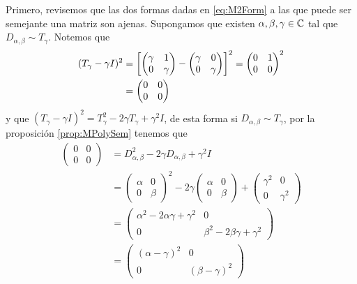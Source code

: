 Primero, revisemos que las dos formas dadas en \eqref{eq:M2Form} a las que puede ser semejante una matriz son ajenas. Supongamos que existen $\alpha, \beta, \gamma \in \mathbb{C}$ tal que $ D_{\alpha, \beta} \sim T_\gamma $. Notemos que
\begin{align*}
  (T_\gamma - \gamma I)^2 
    &= \corch{ \begin{pmatrix} \gamma & 1 \\ 0 & \gamma \end{pmatrix} - \begin{pmatrix} \gamma & 0 \\ 0 & \gamma \end{pmatrix} }^2 
     = \begin{pmatrix} 0 & 1 \\ 0 & 0  \end{pmatrix}^2  \\
    &= \begin{pmatrix} 0 & 0 \\ 0 & 0  \end{pmatrix}
\end{align*}
y que $(T_\gamma - \gamma I)^2 = T_\gamma^2 - 2\gamma T_\gamma + \gamma^2 I$, de esta forma si $ D_{\alpha,\beta} \sim T_\gamma $, por la proposición \ref{prop:MPolySem} tenemos que
\begin{align*}
  \begin{pmatrix} 0 & 0 \\ 0 & 0  \end{pmatrix}
    &= D_{\alpha,\beta}^2 - 2\gamma D_{\alpha,\beta} + \gamma^2 I \\
    &= \begin{pmatrix} \alpha & 0 \\ 0 & \beta \end{pmatrix}^2 - 2\gamma \begin{pmatrix} \alpha & 0 \\ 0 & \beta \end{pmatrix} + \begin{pmatrix} \gamma^2 & 0 \\ 0 & \gamma^2 \end{pmatrix} \\
    &= \begin{pmatrix} \alpha^2 - 2\alpha\gamma + \gamma^2 & 0 \\ 0 & \beta^2 - 2\beta\gamma + \gamma^2 \end{pmatrix} \\
    &= \begin{pmatrix} (\alpha-\gamma)^2 & 0 \\ 0 & (\beta-\gamma)^2 \end{pmatrix} 
\end{align*}
